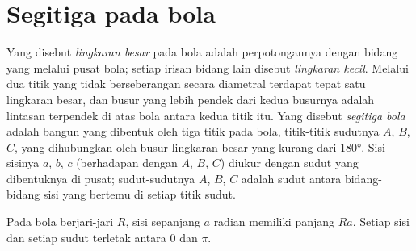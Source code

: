 \section{Segitiga pada bola}

\begin{definition}\label{def:b1:spherical-astronomy:spherical-triangle}
Yang disebut \emph{lingkaran besar} pada bola adalah perpotongannya dengan bidang yang melalui pusat bola; setiap irisan bidang lain disebut \emph{lingkaran kecil}. Melalui dua titik yang tidak berseberangan secara diametral terdapat tepat satu lingkaran besar, dan busur yang lebih pendek dari kedua busurnya adalah lintasan terpendek di atas bola antara kedua titik itu. Yang disebut \emph{segitiga bola} adalah bangun yang dibentuk oleh tiga titik pada bola, titik-titik sudutnya $A$, $B$, $C$, yang dihubungkan oleh busur lingkaran besar yang kurang dari \ang{180}. Sisi-sisinya $a$, $b$, $c$ (berhadapan dengan $A$, $B$, $C$) diukur dengan sudut yang dibentuknya di pusat; sudut-sudutnya $A$, $B$, $C$ adalah sudut antara bidang-bidang sisi yang bertemu di setiap titik sudut.
\end{definition}

Pada bola berjari-jari $R$, sisi sepanjang $a$ radian memiliki panjang $Ra$. Setiap sisi dan setiap sudut terletak antara $0$ dan $\pi$.

